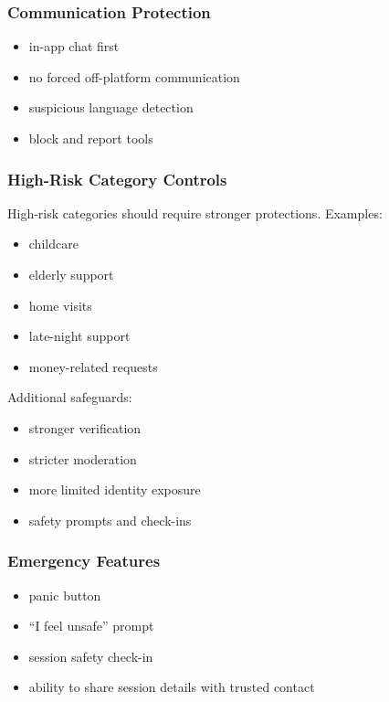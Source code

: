 \documentclass[11pt]{article}
\begin{document}
\subsubsection{Communication Protection}
\begin{itemize}[leftmargin=1.5em]
    \item in-app chat first
    \item no forced off-platform communication
    \item suspicious language detection
    \item block and report tools
\end{itemize}

\subsubsection{High-Risk Category Controls}
High-risk categories should require stronger protections. Examples:
\begin{itemize}[leftmargin=1.5em]
    \item childcare
    \item elderly support
    \item home visits
    \item late-night support
    \item money-related requests
\end{itemize}

Additional safeguards:
\begin{itemize}[leftmargin=1.5em]
    \item stronger verification
    \item stricter moderation
    \item more limited identity exposure
    \item safety prompts and check-ins
\end{itemize}

\subsubsection{Emergency Features}
\begin{itemize}[leftmargin=1.5em]
    \item panic button
    \item ``I feel unsafe'' prompt
    \item session safety check-in
    \item ability to share session details with trusted contact
\end{itemize}
\end{document}
